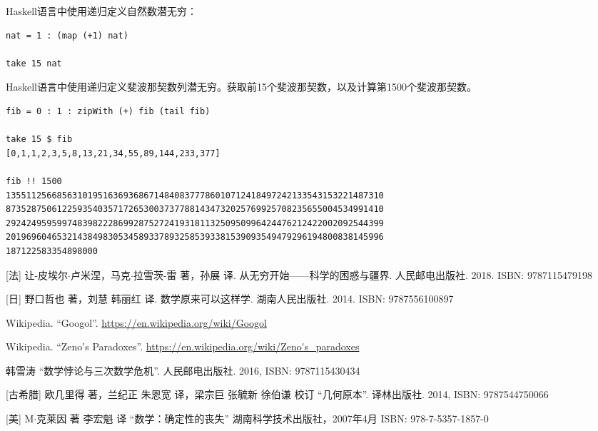 \documentclass{article}
\begin{document}
Haskell语言中使用递归定义自然数潜无穷：

\lstset{frame=single, language=Haskell}
\begin{lstlisting}
nat = 1 : (map (+1) nat)

take 15 nat
\end{lstlisting}

Haskell语言中使用递归定义斐波那契数列潜无穷。获取前15个斐波那契数，以及计算第1500个斐波那契数。

\lstset{frame=single, language=Haskell}
\begin{lstlisting}
fib = 0 : 1 : zipWith (+) fib (tail fib)

take 15 $ fib
[0,1,1,2,3,5,8,13,21,34,55,89,144,233,377]

fib !! 1500
13551125668563101951636936867148408377786010712418497242133543153221487310
87352875061225935403571726530037377881434732025769925708235655004534991410
29242495959974839822286992875272419318113250950996424476212422002092544399
20196960465321438498305345893378932585393381539093549479296194800838145996
187122583354898000
\end{lstlisting}




\ifx\wholebook\relax \else
\begin{thebibliography}{99}

[法] 让-皮埃尔$\cdot$卢米涅，马克$\cdot$拉雪茨-雷 著，孙展 译. 从无穷开始——科学的困惑与疆界. 人民邮电出版社. 2018. ISBN: 9787115479198

[日] 野口哲也 著，刘慧 韩丽红 译. 数学原来可以这样学. 湖南人民出版社. 2014. ISBN: 9787556100897

Wikipedia. ``Googol''. \url{https://en.wikipedia.org/wiki/Googol}

Wikipedia. ``Zeno's Paradoxes''. \url{https://en.wikipedia.org/wiki/Zeno's_paradoxes}

韩雪涛 ``数学悖论与三次数学危机''. 人民邮电出版社. 2016, ISBN: 9787115430434

[古希腊] 欧几里得 著，兰纪正 朱恩宽 译，梁宗巨 张毓新 徐伯谦 校订 ``几何原本''. 译林出版社. 2014, ISBN: 9787544750066

[美] M$\cdot$克莱因 著 李宏魁 译 ``数学：确定性的丧失'' 湖南科学技术出版社，2007年4月 ISBN: 978-7-5357-1857-0

\end{thebibliography}

\expandafter\enddocument

\fi
\end{document}
